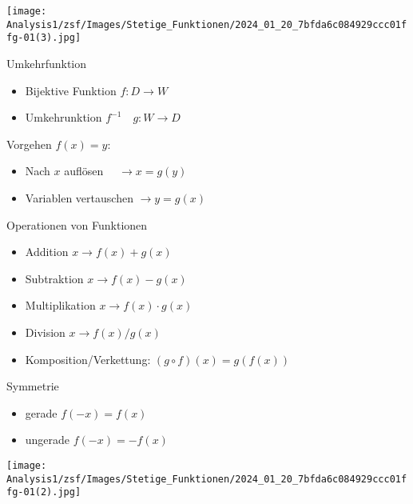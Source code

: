 \begin{center}
    \texttt{[image: Analysis1/zsf/Images/Stetige\_Funktionen/2024\_01\_20\_7bfda6c084929ccc01ffg-01(3).jpg]}
\end{center}


\begin{definition}{Umkehrfunktion}
\begin{itemize}
  \item Bijektive Funktion $f: D \rightarrow W$
  \item Umkehrunktion $f^{-1} \quad g: W \rightarrow D$
\end{itemize}
Vorgehen $f(x)=y$:
\begin{itemize}
  \item Nach $x$ auflösen $\quad \rightarrow x=g(y)$
  \item Variablen vertauschen $\rightarrow y=g(x)$
\end{itemize}
\end{definition}



\begin{theorem}{Operationen von Funktionen}
    \begin{itemize}
  \item Addition $x \rightarrow f(x)+g(x)$
  \item Subtraktion $x \rightarrow f(x)-g(x)$
  \item Multiplikation $x \rightarrow f(x) \cdot g(x)$
    \item Division $x \rightarrow f(x) / g(x)$
\end{itemize}



\begin{itemize}
  \item Komposition/Verkettung: $(g \circ f)(x)=g(f(x))$
\end{itemize}
\end{theorem}

\begin{definition}{Symmetrie}
\begin{itemize}
  \item gerade $f(-x)=f(x)$
  \item ungerade $f(-x)=-f(x)$
\end{itemize}
\end{definition}

\begin{center}
    \texttt{[image: Analysis1/zsf/Images/Stetige\_Funktionen/2024\_01\_20\_7bfda6c084929ccc01ffg-01(2).jpg]}
\end{center}


